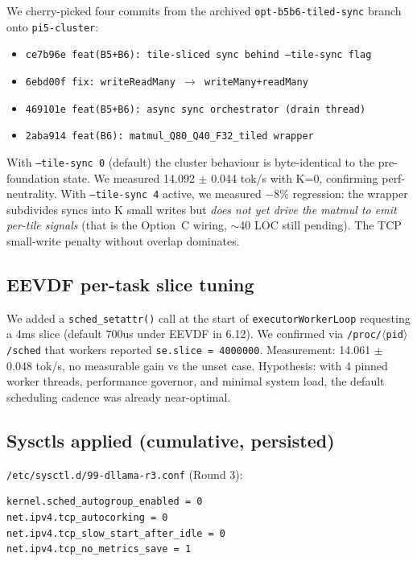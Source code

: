 \documentclass[10pt,a4paper]{article}
\begin{document}
We cherry-picked four commits from the archived \texttt{opt-b5b6-tiled-sync} branch onto \texttt{pi5-cluster}:

\begin{itemize}[leftmargin=*,nosep]
  \item \texttt{ce7b96e feat(B5+B6): tile-sliced sync behind --tile-sync flag}
  \item \texttt{6ebd00f fix: writeReadMany $\to$ writeMany+readMany}
  \item \texttt{469101e feat(B5+B6): async sync orchestrator (drain thread)}
  \item \texttt{2aba914 feat(B6): matmul\_Q80\_Q40\_F32\_tiled wrapper}
\end{itemize}

With \texttt{--tile-sync 0} (default) the cluster behaviour is byte-identical to the pre-foundation state. We measured 14.092 $\pm$ 0.044 tok/s with K=0, confirming perf-neutrality. With \texttt{--tile-sync 4} active, we measured $-8\%$ regression: the wrapper subdivides syncs into K small writes but \emph{does not yet drive the matmul to emit per-tile signals} (that is the Option~C wiring, $\sim$40 LOC still pending). The TCP small-write penalty without overlap dominates.

\subsection{EEVDF per-task slice tuning}

We added a \texttt{sched\_setattr()} call at the start of \texttt{executorWorkerLoop} requesting a 4ms slice (default 700us under EEVDF in 6.12). We confirmed via \texttt{/proc/$\langle$pid$\rangle$/sched} that workers reported \texttt{se.slice = 4000000}. Measurement: 14.061 $\pm$ 0.048 tok/s, no measurable gain vs the unset case. Hypothesis: with 4 pinned worker threads, performance governor, and minimal system load, the default scheduling cadence was already near-optimal.

\subsection{Sysctls applied (cumulative, persisted)}

\texttt{/etc/sysctl.d/99-dllama-r3.conf} (Round 3):

\begin{lstlisting}
kernel.sched_autogroup_enabled = 0
net.ipv4.tcp_autocorking = 0
net.ipv4.tcp_slow_start_after_idle = 0
net.ipv4.tcp_no_metrics_save = 1
\end{lstlisting}
\end{document}
